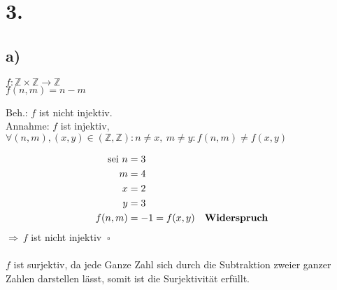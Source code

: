 \documentclass[a4paper]{scrartcl}
\newcommand{\qed}{\ \square}
\begin{document}
\section{3.}
\subsection{a)}
	\(f: \mathbb{Z}\times\mathbb{Z}\rightarrow\mathbb{Z}\)\\
	\(f(n,m)=n-m\)
	\begin{flushleft}
		Beh.: \(f\) ist nicht injektiv.\\
		Annahme: \(f\) ist injektiv,\\
		\(\forall(n,m),(x,y)\in (\mathbb{Z},\mathbb{Z}): n\neq x,\ m\neq y: f(n,m)\neq f(x,y)\)
	\end{flushleft}	
	\begin{align}
		\text{sei }n&=3\\
		m&=4\\
		x&=2\\
		y&=3\\
		f(n,m)&=-1=f(x,y) \quad \text{\textbf{Widerspruch}}
	\end{align}
	\(\Rightarrow\ f\) ist nicht injektiv \(\qed\)\\ 
	\\
	\(f\) ist surjektiv, da jede Ganze Zahl sich durch die Subtraktion zweier ganzer Zahlen darstellen 
	lässt, somit ist die Surjektivität erfüllt.\\
	
\newpage
\end{document}
